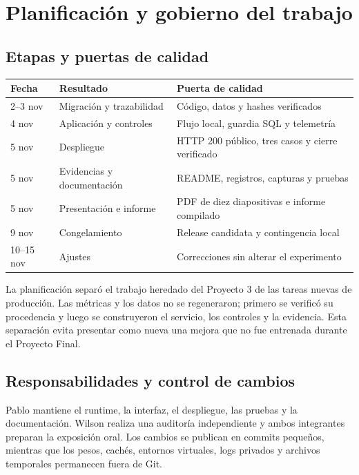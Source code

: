 \documentclass[11pt,letterpaper]{article}
\begin{document}
\section{Planificación y gobierno del trabajo}

\subsection{Etapas y puertas de calidad}

\begin{tabularx}{\textwidth}{@{}lXX@{}}
\toprule
\textbf{Fecha} & \textbf{Resultado} & \textbf{Puerta de calidad}\\
\midrule
2--3 nov & Migración y trazabilidad & Código, datos y hashes verificados\\
4 nov & Aplicación y controles & Flujo local, guardia SQL y telemetría\\
5 nov & Despliegue & HTTP 200 público, tres casos y cierre verificado\\
5 nov & Evidencias y documentación & README, registros, capturas y pruebas\\
5 nov & Presentación e informe & PDF de diez diapositivas e informe compilado\\
9 nov & Congelamiento & Release candidata y contingencia local\\
10--15 nov & Ajustes & Correcciones sin alterar el experimento\\
\bottomrule
\end{tabularx}

La planificación separó el trabajo heredado del Proyecto 3 de las tareas nuevas de producción. Las
métricas y los datos no se regeneraron; primero se verificó su procedencia y luego se construyeron el
servicio, los controles y la evidencia. Esta separación evita presentar como nueva una mejora que no
fue entrenada durante el Proyecto Final.

\subsection{Responsabilidades y control de cambios}

Pablo mantiene el runtime, la interfaz, el despliegue, las pruebas y la documentación. Wilson realiza
una auditoría independiente y ambos integrantes preparan la exposición oral. Los cambios se publican
en commits pequeños, mientras que los pesos, cachés, entornos virtuales, logs privados y archivos
temporales permanecen fuera de Git.
\end{document}
